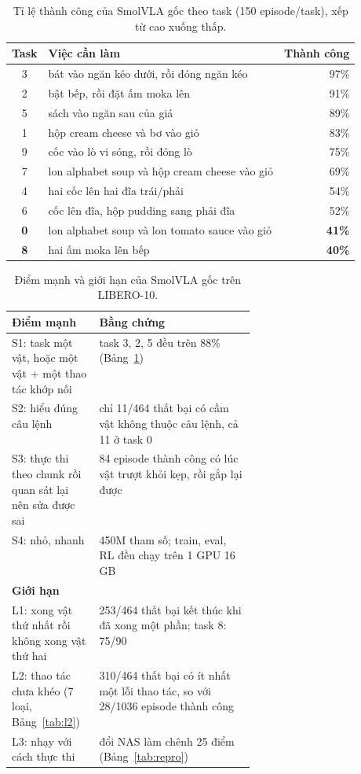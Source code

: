 \documentclass[10pt,a4paper]{article}
\begin{document}
\begin{table}[H]
\centering\small
\begin{tabular}{@{}c l r@{}}
\toprule
Task & Việc cần làm & Thành công \\
\midrule
3 & bát vào ngăn kéo dưới, rồi đóng ngăn kéo & 97\% \\
2 & bật bếp, rồi đặt ấm moka lên & 91\% \\
5 & sách vào ngăn sau của giá & 89\% \\
1 & hộp cream cheese và bơ vào giỏ & 83\% \\
9 & cốc vào lò vi sóng, rồi đóng lò & 75\% \\
7 & lon alphabet soup và hộp cream cheese vào giỏ & 69\% \\
4 & hai cốc lên hai đĩa trái/phải & 54\% \\
6 & cốc lên đĩa, hộp pudding sang phải đĩa & 52\% \\
\textbf{0} & lon alphabet soup và lon tomato sauce vào giỏ & \textbf{41\%} \\
\textbf{8} & hai ấm moka lên bếp & \textbf{40\%} \\
\bottomrule
\end{tabular}
\caption{Tỉ lệ thành công của SmolVLA gốc theo task (150 episode/task), xếp từ cao xuống thấp.}
\label{tab:tasks}
\end{table}

\begin{table}[H]
\centering\small
\begin{tabularx}{\linewidth}{@{}p{0.36\linewidth} X@{}}
\toprule
\textbf{Điểm mạnh} & \textbf{Bằng chứng} \\
\midrule
S1: task một vật, hoặc một vật + một thao tác khớp nối & task 3, 2, 5 đều trên 88\% (Bảng~\ref{tab:tasks}) \\
S2: hiểu đúng câu lệnh & chỉ 11/464 thất bại có cầm vật không thuộc câu lệnh, cả 11 ở task 0 \\
S3: thực thi theo chunk rồi quan sát lại nên sửa được sai & 84 episode thành công có lúc vật trượt khỏi kẹp, rồi gắp lại được \\
S4: nhỏ, nhanh & 450M tham số; train, eval, RL đều chạy trên 1 GPU 16\,GB \\
\midrule
\textbf{Giới hạn} & \\
\midrule
L1: xong vật thứ nhất rồi không xong vật thứ hai & 253/464 thất bại kết thúc khi đã xong một phần; task 8: 75/90 \\
L2: thao tác chưa khéo (7 loại, Bảng~\ref{tab:l2}) & 310/464 thất bại có ít nhất một lỗi thao tác, so với 28/1036 episode thành công \\
L3: nhạy với cách thực thi & đổi NAS làm chênh 25 điểm (Bảng~\ref{tab:repro}) \\
\bottomrule
\end{tabularx}
\caption{Điểm mạnh và giới hạn của SmolVLA gốc trên LIBERO-10.}
\label{tab:analyse}
\end{table}
\end{document}
